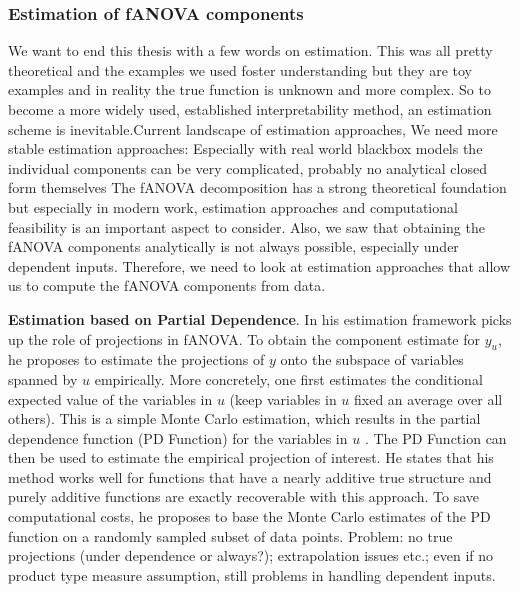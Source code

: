 \subsubsection{Estimation of fANOVA components}
We want to end this thesis with a few words on estimation. This was all pretty theoretical and the examples we used foster understanding but they are toy examples and in reality the true function is unknown and more complex. So to become a more widely used, established interpretability method, an estimation scheme is inevitable.Current landscape of estimation approaches, We need more stable estimation approaches: Especially with real world blackbox models the individual components can be very complicated, probably no analytical closed form themselves
The fANOVA decomposition has a strong theoretical foundation but especially in modern work, estimation approaches and computational feasibility is an important aspect to consider.
Also, we saw that obtaining the fANOVA components analytically is not always possible, especially under dependent inputs. Therefore, we need to look at estimation approaches that allow us to compute the fANOVA components from data.\par

\textbf{Estimation based on Partial Dependence}. In his estimation framework \cite{hooker2004} picks up the role of projections in fANOVA. To obtain the component estimate for $y_u$, he proposes to estimate the projections of $y$ onto the subspace of variables spanned by $u$ empirically.
More concretely, one first estimates the conditional expected value of the variables in $u$ (keep variables in $u$ fixed an average over all others). This is a simple Monte Carlo estimation, which results in the partial dependence function (PD Function) for the variables in $u$ \citep{hooker2004}.
The PD Function can then be used to estimate the empirical projection of interest. He states that his method works well for functions that have a nearly additive true structure and purely additive functions are exactly recoverable with this approach. To save computational costs, he proposes to base the Monte Carlo estimates of the PD function on a randomly sampled subset of data points.
Problem: no true projections (under dependence or always?); extrapolation issues etc.; even if no product type measure assumption, still problems in handling dependent inputs.\par

